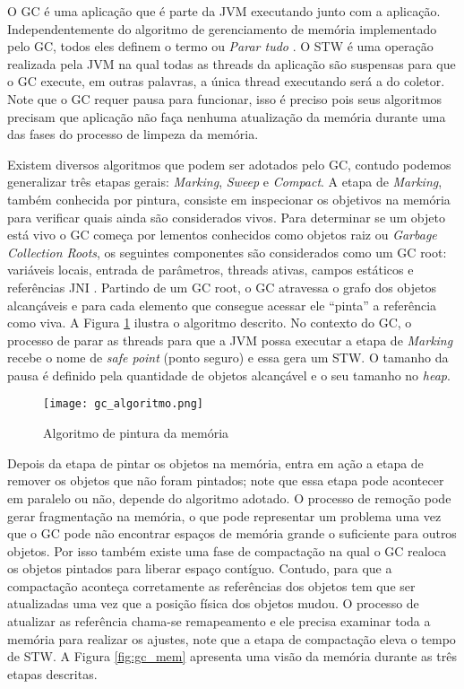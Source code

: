 O GC é uma aplicação que é parte da JVM executando junto com a aplicação.
Independentemente do algoritmo de gerenciamento de memória implementado pelo
GC, todos eles definem o termo  ou
\textit{Parar tudo} \citep{gc_pauseless}. O STW é uma operação realizada pela
JVM  na qual todas as threads da aplicação são suspensas para que o GC execute,
em outras palavras, a única thread executando será a do coletor. Note que o GC
requer pausa para funcionar, isso é preciso pois seus algoritmos precisam que
aplicação não faça nenhuma atualização da memória durante uma das fases do
processo de limpeza da memória.

Existem diversos algoritmos que podem ser adotados pelo GC, contudo podemos
generalizar três etapas gerais: \textit{Marking}, \textit{Sweep} e
\textit{Compact}. A etapa de \textit{Marking}, também conhecida por pintura,
consiste em inspecionar os objetivos na memória para verificar quais ainda são
considerados vivos. Para determinar se um objeto está vivo o GC começa por
lementos conhecidos como objetos raiz ou \textit{Garbage Collection Roots}, os
seguintes componentes são considerados como um GC root: variáveis locais,
entrada de parâmetros, threads ativas, campos estáticos e referências JNI
\citep{gc_basics}. Partindo de um GC root, o GC atravessa o grafo dos objetos
alcançáveis e para cada elemento que consegue acessar ele “pinta” a referência
como viva. A Figura \ref{fig:gc_alg} ilustra o algoritmo descrito. No contexto
do GC, o processo de parar as threads para que a JVM possa executar a etapa de
\textit{Marking} recebe o nome de \textit{safe point} (ponto seguro) e essa
gera um STW. O tamanho da pausa é definido pela quantidade de objetos
alcançável e o seu tamanho no \textit{heap}.

\begin{figure}[!h]
  \centering
  \texttt{[image: gc\_algoritmo.png]}
  \caption{Algoritmo de pintura da memória\citep{gc_basics}}
  \label{fig:gc_alg}
\end{figure}

Depois da etapa de pintar os objetos na memória, entra em ação a etapa de
remover os objetos que não foram pintados; note que essa etapa pode acontecer
em paralelo ou não, depende do algoritmo adotado. O processo de remoção pode
gerar fragmentação na memória, o que pode representar um problema uma vez que o
GC pode não encontrar espaços de memória grande o suficiente para outros
objetos. Por isso também existe uma fase de compactação na qual o GC realoca os
objetos pintados para liberar espaço contíguo. Contudo, para que a compactação
aconteça corretamente as referências dos objetos tem que ser atualizadas uma
vez que a posição física dos objetos mudou. O processo de atualizar as
referência chama-se remapeamento e ele precisa examinar toda a memória para
realizar os ajustes, note que a etapa de compactação eleva o tempo de STW. A
Figura \ref{fig:gc_mem} apresenta uma visão da memória durante as três etapas
descritas.

